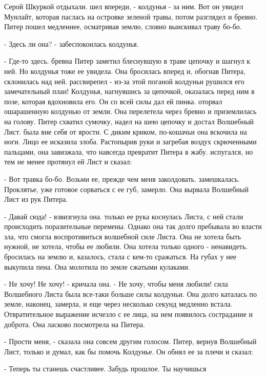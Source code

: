 Серой Шкуркой отдыхали.
 шел впереди, - колдунья - за ним. Вот он увидел Мунлайт, 
которая паслась на островке зеленой травы, потом разглядел и бревно. 
Питер пошел медленнее, осматривая землю, словно выискивал траву бо-бо.
\par- Здесь ли она? - забеспокоилась колдунья.
\par- Где-то здесь.
 бревна Питер заметил блеснувшую в траве цепочку и шагнул к 
ней. Но колдунья тоже ее увидела. Она бросилась вперед и, обогнав 
Питера, склонилась над ней.
 рассвирепел - из-за этой поганой колдуньи рушился его 
замечательный план! Колдунья, нагнувшись за цепочкой, оказалась перед 
ним в позе, которая вдохновила его. Он со всей силы дал ей пинка.
 оторвал ошарашенную колдунью от земли. Она перелетела через 
бревно и приземлилась на голову. Питер схватил сумочку, надел на шею 
цепочку и достал Волшебный Лист.
 была вне себя от ярости. С диким криком, по-кошачьи она 
вскочила на ноги. Лицо ее исказила злоба. Растопырив руки и загребая 
воздух скрюченными пальцами, она завизжала, что навсегда превратит 
Питера в жабу.
 испугался, но тем не менее протянул ей Лист и сказал:
\par- Вот травка бо-бо. Возьми ее, прежде чем меня заколдовать.
 замешкалась. Проклятье, уже готовое сорваться с ее губ, 
замерло. Она вырвала Волшебный Лист из рук Питера.
\par- Давай сюда! - взвизгнула она.
 только ее рука коснулась Листа, с ней стали происходить 
поразительные перемены. Однако она так долго пребывала во власти зла, 
что смогла воспротивиться волшебной силе Листа. Она не хотела быть 
нужной, не хотела, чтобы ее любили. Она хотела только одного - 
ненавидеть.
 бросилась на землю и, казалось, стала с кем-то сражаться. 
На губах у нее выкупила пена. Она молотила по земле сжатыми кулаками.
\par- Не хочу! Не хочу! - кричала она. - Не хочу, чтобы меня любили!
 сила Волшебного Листа была все-таки больше силы колдуньи. Она 
долго каталась по земле, наконец, замерла, и еще через несколько 
секунд медленно встала. Отвратительное выражение исчезло с ее лица, на 
нем появилось сострадание и доброта. Она ласково посмотрела на Питера.
\par- Прости меня, - сказала она совсем другим голосом.
 Питер, вернув Волшебный Лист, только и думал, как бы помочь 
Колдунье. Он обнял ее за плечи и сказал:
\par- Теперь ты станешь счастливее. Забудь прошлое. Ты научишься 
